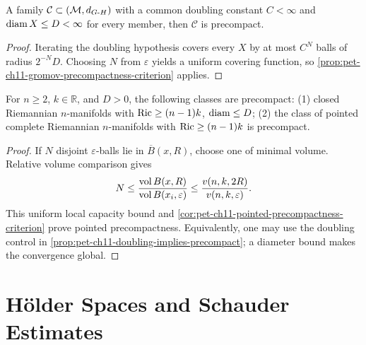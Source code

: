 \begin{proposition}
  \label{prop:pet-ch11-doubling-implies-precompact}

  A family $\mathcal{C}\subset(\mathcal{M},d_{G\text{-}H})$ with a common doubling
  constant $C<\infty$ and $\operatorname{diam} X\le D<\infty$ for every member, then
  $\mathcal{C}$ is precompact.
\end{proposition}
\begin{proof}
  \sketch
  Iterating the doubling hypothesis covers every \(X\) by at most \(C^N\)
  balls of radius \(2^{-N}D\). Choosing \(N\) from \(\varepsilon\) yields a
  uniform covering function, so
  \cref{prop:pet-ch11-gromov-precompactness-criterion} applies.
\end{proof}


\begin{corollary}
  \label{cor:pet-ch11-ricci-diam-precompactness}

  For $n\ge2$, $k\in\mathbb{R}$, and $D>0$, the following classes are
  precompact: (1) closed Riemannian
  $n$-manifolds with $\operatorname{Ric}\ge(n-1)k$, $\operatorname{diam}\le D$; (2) the
  class of pointed complete Riemannian $n$-manifolds with $\operatorname{Ric}\ge(n-1)k$ is
  precompact.
\end{corollary}
\begin{proof}
  \sketch
  If \(N\) disjoint \(\varepsilon\)-balls lie in \(\overline B(x,R)\), choose one of minimal volume. Relative volume comparison gives
  \[
    N\le \frac{\operatorname{vol} B(x,R)}{\operatorname{vol} B(x_i,\varepsilon)}
      \le \frac{v(n,k,2R)}{v(n,k,\varepsilon)}.
  \]
  This uniform local capacity bound and
  \cref{cor:pet-ch11-pointed-precompactness-criterion} prove pointed
  precompactness. Equivalently, one may use the doubling control in
  \cref{prop:pet-ch11-doubling-implies-precompact}; a diameter bound makes the
  convergence global.
\end{proof}


\section{Hölder Spaces and Schauder Estimates}

